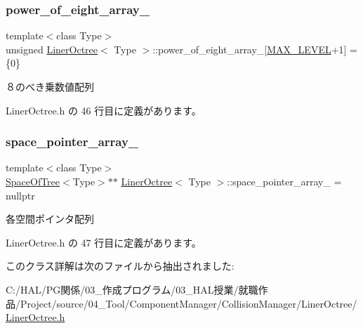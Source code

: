\subsubsection{\texorpdfstring{power\+\_\+of\+\_\+eight\+\_\+array\+\_\+}{power\_of\_eight\_array\_}}
{\footnotesize\ttfamily template$<$class Type$>$ \\
unsigned \mbox{\hyperlink{class_liner_octree}{Liner\+Octree}}$<$ Type $>$\+::power\+\_\+of\+\_\+eight\+\_\+array\+\_\+\mbox{[}\mbox{\hyperlink{class_liner_octree_aced865f2822181486eb805e4db1f0a32}{M\+A\+X\+\_\+\+L\+E\+V\+EL}}+1\mbox{]} = \{0\}\hspace{0.3cm}{\ttfamily [private]}}



８のべき乗数値配列 



 Liner\+Octree.\+h の 46 行目に定義があります。

\mbox{\label{class_liner_octree_a0ffc2effd42779c7f88c4eecc8a68bfb}} 
\subsubsection{\texorpdfstring{space\+\_\+pointer\+\_\+array\+\_\+}{space\_pointer\_array\_}}
{\footnotesize\ttfamily template$<$class Type$>$ \\
\mbox{\hyperlink{class_space_of_tree}{Space\+Of\+Tree}}$<$Type$>$$\ast$$\ast$ \mbox{\hyperlink{class_liner_octree}{Liner\+Octree}}$<$ Type $>$\+::space\+\_\+pointer\+\_\+array\+\_\+ = nullptr\hspace{0.3cm}{\ttfamily [private]}}



各空間ポインタ配列 



 Liner\+Octree.\+h の 47 行目に定義があります。



このクラス詳解は次のファイルから抽出されました\+:\begin{DoxyCompactItemize}
\item 
C\+:/\+H\+A\+L/\+P\+G関係/03\+\_\+作成プログラム/03\+\_\+\+H\+A\+L授業/就職作品/\+Project/source/04\+\_\+\+Tool/\+Component\+Manager/\+Collision\+Manager/\+Liner\+Octree/\mbox{\hyperlink{_liner_octree_8h}{Liner\+Octree.\+h}}\end{DoxyCompactItemize}
